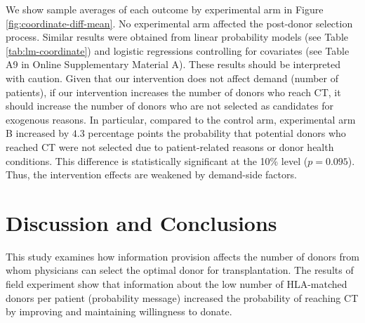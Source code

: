 \documentclass[12pt, a4paper]{article}
\begin{document}
We show sample averages of each outcome by experimental arm in Figure \ref{fig:coordinate-diff-mean}. No experimental arm affected the post-donor selection process. Similar results were obtained from linear probability models (see Table \ref{tab:lm-coordinate}) and logistic regressions controlling for covariates (see Table A9 in Online Supplementary Material A). These results should be interpreted with caution. Given that our intervention does not affect demand (number of patients), if our intervention increases the number of donors who reach CT, it should increase the number of donors who are not selected as candidates for exogenous reasons. In particular, compared to the control arm, experimental arm B increased by \(4.3\) percentage points the probability that potential donors who reached CT were not selected due to patient-related reasons or donor health conditions. This difference is statistically significant at the 10\% level (\(p = 0.095\)). Thus, the intervention effects are weakened by demand-side factors.

\hypertarget{conclusion}{%
\section{Discussion and Conclusions}\label{conclusion}}

This study examines how information provision affects the number of donors from whom physicians can select the optimal donor for transplantation. The results of field experiment show that information about the low number of HLA-matched donors per patient (probability message) increased the probability of reaching CT by improving and maintaining willingness to donate.
\end{document}
